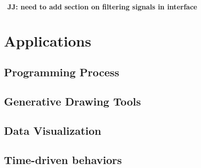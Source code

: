 \documentclass{sigchi}
\newcommand {\jen}[1]{{\color{teal}\bf{JJ: #1}\normalfont}}
\begin{document}
~\jen{need to add section on filtering signals in interface}
\section{Applications}
\subsection{Programming Process}
\subsection{Generative Drawing Tools}
\subsection{Data Visualization}
\subsection{Time-driven behaviors}

\balance{}

\balance{}



\end{document}
